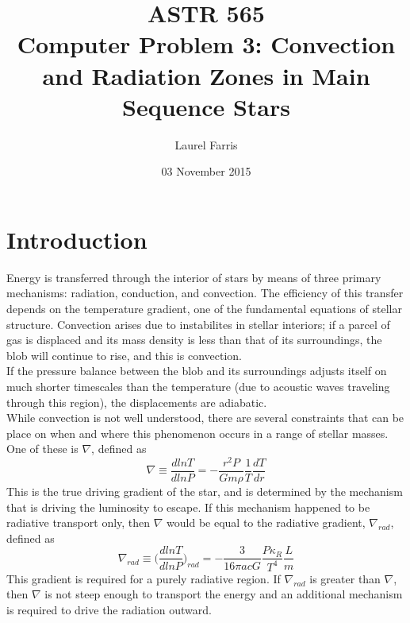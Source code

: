 \documentclass[12pt]{article}
\title{ASTR 565 \\
Computer Problem 3: Convection and Radiation Zones in Main Sequence
Stars}
\author{Laurel Farris}
\date{03 November 2015}
\begin{document}
\maketitle

\section{Introduction}
Energy is transferred through the interior of stars by means of three
primary mechanisms: radiation, conduction, and convection. The
efficiency of this transfer depends on the temperature gradient, one
of the fundamental equations of stellar structure.
Convection
 arises due to instabilites in stellar interiors;
 if a parcel of gas is displaced and its
mass density is less than that of its surroundings,
the blob will continue to rise, and this is convection.\\

\noindent
If the pressure balance between the blob and its surroundings adjusts
itself on much shorter timescales than the temperature (due to
acoustic waves traveling through this region), the displacements are
adiabatic.\\


\noindent
While convection is not well understood, there
are several constraints that can be place on when and where this
phenomenon occurs in a range of stellar masses.
One of these is
$\nabla$, defined as
 \begin{equation}
    \nabla \equiv \frac{dln T}{dlnP} = -\frac{r^2P}{Gm\rho}
    \frac{1}{T}\frac{dT}{dr}
 \end{equation}
This is the true driving gradient of the star, and is determined by
the
mechanism that is driving the luminosity to escape. If this mechanism
happened to be radiative transport only, then $\nabla$ would be equal
to the radiative gradient, $\nabla_{rad}$, defined as
\begin{equation}
    \nabla_{rad} \equiv \Big(\frac{dlnT}{dlnP}\Big)_{rad}
    = -\frac{3}{16\pi acG}
    \frac{P\kappa_R}{T^4}\frac{L}{m}
\end{equation}
This gradient is required for a purely
radiative region. If $\nabla_{rad}$ is
greater than $\nabla$, then $\nabla$ is not steep enough to transport the
energy and an additional mechanism is required to drive the
radiation outward.\\
\end{document}
